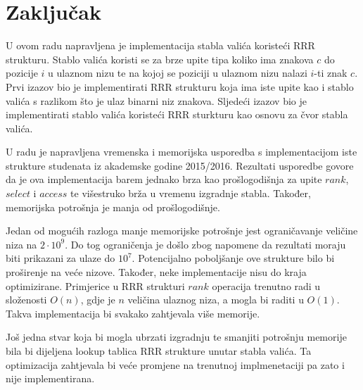 \documentclass[times, utf8, seminar, numeric]{fer}
\begin{document}
\chapter{Zaključak}
\label{sec:conclusion}

U ovom radu napravljena je implementacija stabla valića koristeći RRR strukturu. Stablo valića koristi se za brze upite tipa koliko ima znakova $c$ do pozicije $i$ u ulaznom nizu te na kojoj se poziciji u ulaznom nizu nalazi $i$-ti znak $c$. Prvi izazov bio je implementirati RRR strukturu koja ima iste upite kao i stablo valića s razlikom što je ulaz binarni niz znakova. Sljedeći izazov bio je implementirati stablo valića koristeći RRR sturkturu kao osnovu za čvor stabla valića. 

U radu je napravljena vremenska i memorijska usporedba s implementacijom iste strukture studenata iz akademske godine 2015/2016. Rezultati usporedbe govore da je ova implementacija barem jednako brza kao prošlogodišnja za upite $rank$, $select$ i $access$ te višestruko brža u vremenu izgradnje stabla. Također, memorijska potrošnja je manja od prošlogodišnje.

Jedan od mogućih razloga manje memorijske potrošnje jest ograničavanje veličine niza na $2 \cdot 10^9$. Do tog ograničenja je došlo zbog napomene da rezultati moraju biti prikazani za ulaze do $10^7$. Potencijalno poboljšanje ove strukture bilo bi proširenje na veće nizove. Također, neke implementacije nisu do kraja optimizirane. Primjerice u RRR strukturi $rank$ operacija trenutno radi u složenosti $O(n)$, gdje je $n$ veličina ulaznog niza, a mogla bi raditi u $O(1)$. Takva implementacija bi svakako zahtjevala više memorije. 

Još jedna stvar koja bi mogla ubrzati izgradnju te smanjiti potrošnju memorije bila bi dijeljena lookup tablica RRR strukture unutar stabla valića. Ta optimizacija zahtjevala bi veće promjene na trenutnoj implmenetaciji pa zato i nije implementirana. 




\end{document}
